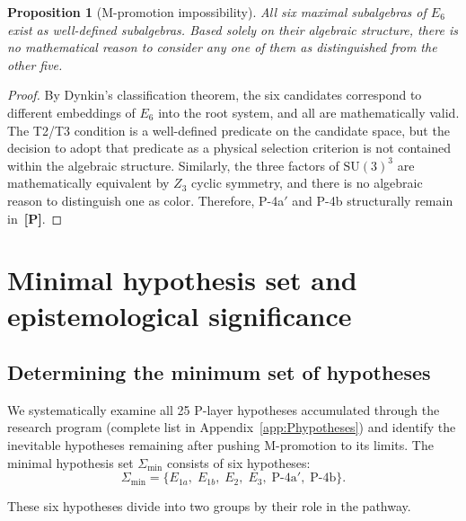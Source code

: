 \documentclass[sn-mathphys-num,Numbered]{sn-jnl}
\theoremstyle{thmstyleone}
\theoremstyle{thmstylethree}
\newtheorem{proposition}[theorem]{Proposition}
\newcommand{\Amin}{\Sigma_{\min}}
\newcommand{\SU}{\mathrm{SU}}
\newcommand{\layerP}{\textbf{[P]}}
\begin{document}
\begin{proposition}[M-promotion impossibility]\label{prop:M-impossible}
All six maximal subalgebras of $E_6$ exist as well-defined subalgebras.  Based
solely on their algebraic structure, there is no mathematical reason to
consider any one of them as distinguished from the other five.
\end{proposition}

\begin{proof}
By Dynkin's classification theorem, the six candidates correspond to different
embeddings of $E_6$ into the root system, and all are mathematically valid.
The T2/T3 condition is a well-defined predicate on the candidate space, but the
decision to adopt that predicate as a physical selection criterion is not
contained within the algebraic structure.  Similarly, the three factors of
$\SU(3)^3$ are mathematically equivalent by $Z_3$ cyclic symmetry, and there
is no algebraic reason to distinguish one as color.  Therefore, P-4a$'$ and
P-4b structurally remain in~\layerP.
\end{proof}


\section{Minimal hypothesis set and epistemological
  significance}\label{sec:Sigmamin}


\subsection{Determining the minimum set of hypotheses}\label{sec:determine}

We systematically examine all 25 P-layer hypotheses accumulated through the
research program (complete list in Appendix~\ref{app:Phypotheses}) and
identify the inevitable hypotheses remaining after pushing M-promotion to its
limits.  The minimal hypothesis set $\Amin$ consists of six hypotheses:
\begin{equation}\label{eq:Sigmamin}
  \boxed{\Amin = \bigl\{E_{1a},\; E_{1b},\; E_2,\; E_3,\;
    \text{P-4a}',\; \text{P-4b}\bigr\}.}
\end{equation}

These six hypotheses divide into two groups by their role in the pathway.
\end{document}
